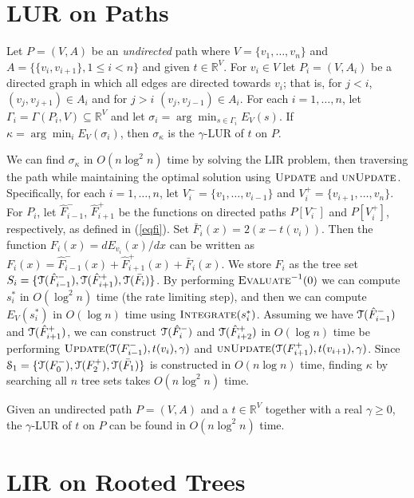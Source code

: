 \documentclass[11pt]{article}
\def\TT{\EuScript{T}}
\def\reals{\mathbb{R}}
\def\eval{\mathop{\mbox{\textsc{Evaluate}}}}
\def\Update{\mathop{\textsc{Update}}}
\def\UnUpdate{\mathop{\textsc{unUpdate}}}
\def\integrate{\mathop{\textsc{Integrate}}}
\newcommand{\hF}{\hat{F}}
\renewcommand{\c}[1]{\ensuremath{\EuScript{#1}}}
\begin{document}
\section{LUR on Paths} \label{sec:pathlur}
Let $P = (V, A)$ be an {\em undirected} path where $V = \{v_1, \dots, v_n\}$ and $A = \{\{v_i,v_{i+1}\}, 1 \leq i < n\}$ and given $t \in \reals^V$. For $v_i \in V$ let $P_i=(V,A_i)$ be a directed graph in which all edges are directed 
towards $v_i$; that is, for $j<i$, $(v_j, v_{j+1}) \in A_i$ and for $j>i$ $(v_j, v_{j-1}) \in A_i$.  
For each $i = 1, \dots, n$, let $\Gamma_i = \Gamma(P_i, V) \subseteq \reals^V$ and let $\sigma_i = \arg\min_{s \in \Gamma_i} E_V(s)$.  
If $\kappa = \arg \min_{i} E_V(\sigma_i)$, then $\sigma_\kappa$ is the $\gamma$-LUR of $t$ on $P$.

We can find $\sigma_\kappa$ in $O(n \log^2 n)$ time by solving the LIR problem, then traversing the path while maintaining the optimal solution using $\Update$ and $\UnUpdate$.  Specifically,
for each $i=1,\dots, n$, let $V_i^- = \{v_1, \ldots, v_{i-1}\}$ and $V_i^+ = \{v_{i+1}, \ldots, v_n\}$. 
For $P_i$, let $\hF^-_{i-1}$, $\hF^+_{i+1}$ be the functions on directed paths $P[V_i^-]$ and $P[V_i^+]$, respectively, as defined in (\ref{eqfi}).  Set $\bar{F}_i(x) = 2(x-t(v_i))$.  Then the function $F_i(x) = d E_{v_i}(x) / dx$ can be written as $F_i(x) = \hF_{i-1}^-(x) + \hF_{i+1}^+(x) + \bar{F}_i(x)$.  We store $F_i$ as the tree set $S_i = \{\TT(\hF_{i-1}^-), \TT(\hF_{i+1}^+), \TT(\bar{F}_i)\}$.  
By performing $\eval^{-1}(0)$ we can compute $s_i^*$ in $O(\log^2 n)$ time (the rate limiting step), and then we can compute $E_{V}(s_i^*)$ in $O(\log n)$ time using $\integrate(s_i^*)$.  
Assuming we have $\TT(\hF_{i-1}^-)$ and $\TT(\hF_{i+1}^+)$, we can construct $\TT(\hF_i^-)$ and $\TT(\hF_{i+2}^+)$ in $O(\log n)$ time be performing 
$\Update(\TT(F^-_{i-1}), t(v_i), \gamma)$ and 
$\UnUpdate(\TT(F^+_{i+1}), t(v_{i+1}), \gamma)$.  
Since $\c{S}_1 = \{\TT(F^-_0), \TT(F^+_2), \TT(\bar{F}_1)\}$ is constructed 
in $O(n \log n)$ time, finding $\kappa$ by searching all $n$ tree sets 
takes $O(n \log^2 n)$ time.


\begin{theorem}
Given an undirected path $P = (V, A)$ and a $t \in \mathbb{R}^V$ together with a real $\gamma \geq 0$, the
$\gamma$-LUR of $t$ on $P$ can be found in $O(n\log^2 n)$ time.
\end{theorem}



\section{LIR on Rooted Trees} \label{sec:treelir} 
\end{document}
